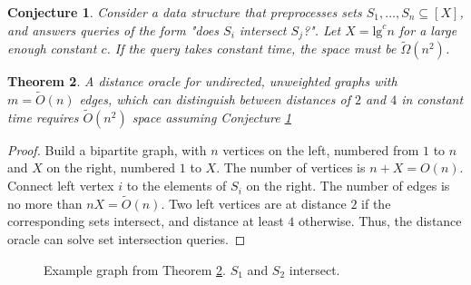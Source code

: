 \documentclass[shortabstract, lic, english]{iithesis}
\theoremstyle{definition} \newtheorem{definition}{Definition}[chapter]
\theoremstyle{plain} \newtheorem{remark}[definition]{Observation}
\theoremstyle{plain} \newtheorem{theorem}[definition]{Theorem}
\theoremstyle{plain} \newtheorem{lemma}[definition]{Lemma}
\theoremstyle{plain} \newtheorem{conjecture}[definition]{Conjecture}
\begin{document}
\begin{conjecture} \label{setIntersectionQueries} \cite{21OracleLessMemory}
    Consider a data structure that preprocesses sets $S_1, \ldots, S_n \subseteq [X]$, and answers queries of the form "does $S_i$ intersect $S_j$?".
    Let $X = \text{lg}^c n$ for a large enough constant $c$.
    If the query takes constant time, the space must be $\tilde{\Omega}(n^2)$.
\end{conjecture}

\begin{theorem} \label{alphaAbove2} \cite{21OracleLessMemory}
    A distance oracle for undirected, unweighted graphs with $m = \tilde{O}(n)$ edges, which can distinguish between distances of $2$ and $4$ in constant time
    requires $\tilde{O}(n^2)$ space assuming Conjecture \ref{setIntersectionQueries}
\end{theorem}

\begin{proof}
    Build a bipartite graph, with $n$ vertices on the left, numbered from $1$ to $n$ and $X$ on the right, numbered $1$ to $X$. The number of vertices
    is $n + X = O(n)$. Connect left vertex $i$ to the elements of $S_i$ on the right. The number of edges is no more than $nX = \tilde{O}(n)$.
    Two left vertices are at distance $2$ if the corresponding sets intersect, and distance at least $4$ otherwise.
    Thus, the distance oracle can solve set intersection queries.
\end{proof}

\begin{figure}[h]
    \centering              
    \caption{Example graph from Theorem \ref{alphaAbove2}. $S_1$ and $S_2$ intersect.}
\end{figure}
\end{document}

